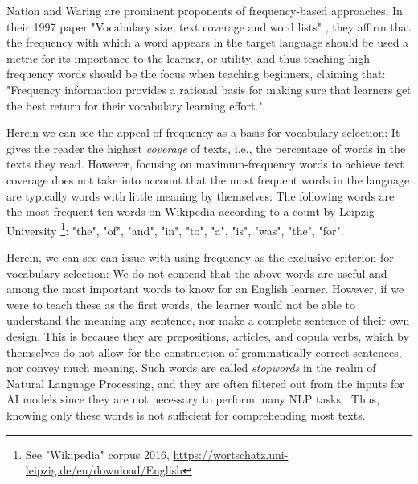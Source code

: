 Nation and Waring are prominent proponents of frequency-based approaches:
In their 1997 paper "Vocabulary size, text coverage and word lists" \cite{nationVocabularySizeText1997}, they affirm that the frequency with which a word appears in the target language should be used a metric for its importance to the learner, or utility, and thus teaching high-frequency words should be the focus when teaching beginners, claiming that:
"Frequency information provides a rational basis for making sure that learners get the best return for their vocabulary learning effort."

Herein we can see the appeal of frequency as a basis for vocabulary selection:
It gives the reader the highest \textit{coverage} of texts, i.e., the percentage of words in the texts they read.
However, focusing on maximum-frequency words to achieve text coverage does not take into account that the most frequent words in the language are typically words with little meaning by themselves:
The following words are the most frequent ten words on Wikipedia according to a count by Leipzig University \footnote{See "Wikipedia" corpus 2016, \url{https://wortschatz.uni-leipzig.de/en/download/English}}:
"the", "of", "and", "in", "to", "a", "is", "was", "the", "for".

Herein, we can see can issue with using frequency as the exclusive criterion for vocabulary selection:
We do not contend that the above words are useful and among the most important words to know for an English learner.
However, if we were to teach these as the first words, the learner would not be able to understand the meaning any sentence, nor make a complete sentence of their own design.
This is because they are prepositions, articles, and copula verbs, which by themselves do not allow for the construction of grammatically correct sentences, nor convey much meaning.
Such words are called \textit{stopwords} in the realm of Natural Language Processing, and they are often filtered out from the inputs for AI models since they are not necessary to perform many NLP tasks \cite{jurafskySpeechLanguageProcessing2025}.
Thus, knowing only these words is not sufficient for comprehending most texts.


%

